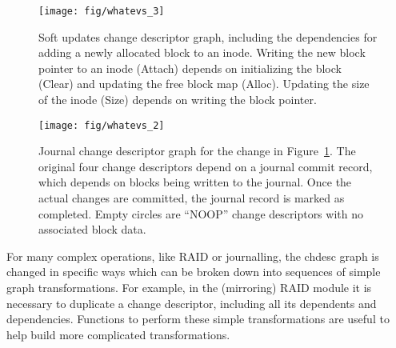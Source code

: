 \begin{figure}[b]
  \centering
  \texttt{[image: fig/whatevs\_3]}%
  \caption{\label{fig:softupdates} Soft updates change descriptor graph,
  including the dependencies for adding a newly allocated block to an
  inode. Writing the new block pointer to an inode (Attach) depends on
  initializing the block (Clear) and updating the free block map (Alloc).
  Updating the size of the inode (Size) depends on writing the block
  pointer.}
\end{figure}

\begin{figure}
  \centering
  \texttt{[image: fig/whatevs\_2]}%
  \caption{\label{fig:journal} Journal change descriptor graph for the
  change in Figure~\ref{fig:softupdates}.  The original four change
  descriptors depend on a journal commit record, which depends on blocks
  being written to the journal.  Once the actual changes are committed, the
  journal record is marked as completed.  Empty circles are ``NOOP'' change
  descriptors with no associated block data.  }
\end{figure}

For many complex operations, like RAID or journalling, the chdesc graph is
changed in specific ways which can be broken down into sequences of simple graph
transformations. For example, in the (mirroring) RAID module it is necessary to
duplicate a change descriptor, including all its dependents and dependencies.
Functions to perform these simple transformations are useful to help build more
complicated transformations.


